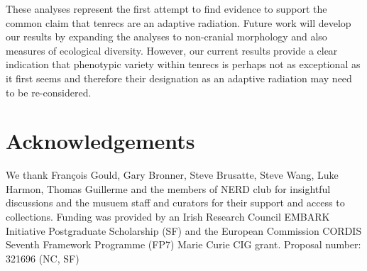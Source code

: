 \documentclass[12pt,a4paper]{article}
\begin{document}

These analyses represent the first attempt to find evidence to support the common claim that tenrecs are an adaptive radiation. Future work will develop our results by expanding the analyses to non-cranial morphology and also measures of ecological diversity. However, our current results provide a clear indication that phenotypic variety within tenrecs is perhaps not as exceptional as it first seems and therefore their designation as an adaptive radiation may need to be re-considered.




\section*{Acknowledgements}

We thank Fran\c{c}ois Gould, Gary Bronner, Steve Brusatte, Steve Wang, Luke Harmon, Thomas Guillerme and the members of NERD club for insightful discussions and the musuem staff and curators for their support and access to collections. Funding was provided by an Irish Research Council EMBARK Initiative Postgraduate Scholarship (SF) and the European Commission CORDIS Seventh Framework Programme (FP7) Marie Curie CIG grant. Proposal number: 321696 (NC, SF)






\end{document}
